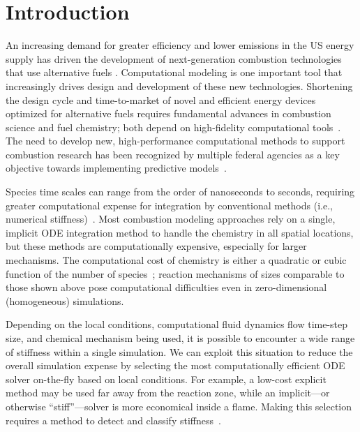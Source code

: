 \documentclass[12pt]{ussci}
\begin{document}
\section{Introduction}
%

An increasing demand for greater efficiency and lower  emissions in the US energy supply has driven the development of next-generation combustion technologies that use alternative fuels \cite{Epstein2012}. Computational modeling is one important tool that increasingly drives design and development of these new technologies. Shortening the design cycle and time-to-market of novel and efficient energy devices optimized for alternative fuels requires fundamental advances in combustion science and fuel chemistry; both depend on high-fidelity computational tools~\cite{Niemeyer}. The need to develop new, high-performance computational methods to support combustion research has been recognized by multiple federal agencies as a key objective towards implementing predictive models~\cite{Trouve:2006tq,DOE:2007tj,NationalResearchCouncil:2011ub,National-Research-Council:2014aa}.

Species time scales can range from the order of nanoseconds to seconds, requiring greater computational expense for integration by conventional methods (i.e., numerical stiffness)~\cite{Lu2009}. Most combustion modeling approaches rely on a single, implicit ODE integration method to handle the chemistry in all spatial locations, but these methods are computationally expensive, especially for larger mechanisms. The computational cost of chemistry is either a quadratic or cubic function of the number of species~\cite{Lu2009}; reaction mechanisms of sizes comparable to those shown above pose computational difficulties even in zero-dimensional (homogeneous) simulations.

Depending on the local conditions, computational fluid dynamics flow time-step size, and chemical mechanism being used, it is possible to encounter a wide range of stiffness within a single simulation. We can exploit this situation to reduce the overall simulation expense by selecting the most computationally efficient ODE solver on-the-fly based on local conditions. For example, a low-cost explicit method may be used far away from the reaction zone, while an implicit---or otherwise ``stiff''---solver is more economical inside a flame. Making this selection requires a method to detect and classify stiffness~\cite{Niemeyer}.
\end{document}
